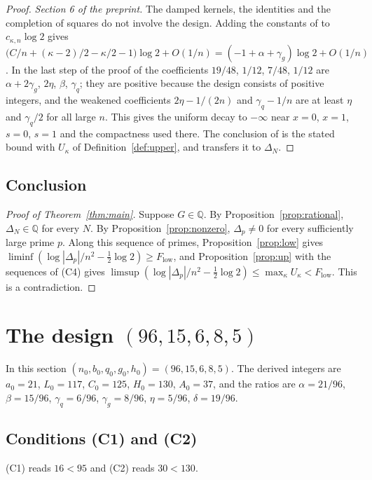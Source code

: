 \documentclass[11pt]{article}
\theoremstyle{definition}
\begin{document}
\begin{proof}
\emph{Section 6 of the preprint.} The damped kernels, the identities \cite[Eqs.~(86), (87)]{OAI} and the completion of squares do not involve the design. Adding the constants of \cite[Eqs.~(86), (87)]{OAI} to $c_{\kappa,n}\log2$ gives $\big(C/n+(\kappa-2)/2-\kappa/2-1\big)\log2+O(1/n)=(-1+\alpha+\gamma_g)\log2+O(1/n)$. In the last step of the proof of \cite[Prop.~6.1]{OAI} the coefficients $19/48$, $1/12$, $7/48$, $1/12$ are $\alpha+2\gamma_g$, $2\eta$, $\beta$, $\gamma_q$; they are positive because the design consists of positive integers, and the weakened coefficients $2\eta-1/(2n)$ and $\gamma_q-1/n$ are at least $\eta$ and $\gamma_q/2$ for all large $n$. This gives the uniform decay to $-\infty$ near $x=0$, $x=1$, $s=0$, $s=1$ and the compactness used there. The conclusion of \cite[Prop.~6.1]{OAI} is the stated bound with $U_\kappa$ of Definition~\ref{def:upper}, and \cite[Eq.~(75)]{OAI} transfers it to $\Delta_N$.
\end{proof}

\subsection{Conclusion}

\begin{proof}[Proof of Theorem~\ref{thm:main}]
Suppose $G\in\mathbb Q$. By Proposition~\ref{prop:rational}, $\Delta_N\in\mathbb Q$ for every $N$. By Proposition~\ref{prop:nonzero}, $\Delta_p\ne0$ for every sufficiently large prime $p$. Along this sequence of primes, Proposition~\ref{prop:low} gives $\liminf(\log|\Delta_p|/n^2-\frac12\log2)\ge F_{\mathrm{low}}$, and Proposition~\ref{prop:up} with the sequences of (C4) gives $\limsup(\log|\Delta_p|/n^2-\frac12\log2)\le\max_\kappa U_\kappa<F_{\mathrm{low}}$. This is a contradiction.
\end{proof}

\section{The design \texorpdfstring{$(96,15,6,8,5)$}{(96,15,6,8,5)}}\label{sec:design}

In this section $(n_0,b_0,q_0,g_0,h_0)=(96,15,6,8,5)$. The derived integers are $a_0=21$, $L_0=117$, $C_0=125$, $H_0=130$, $A_0=37$, and the ratios are $\alpha=21/96$, $\beta=15/96$, $\gamma_q=6/96$, $\gamma_g=8/96$, $\eta=5/96$, $\delta=19/96$.

\subsection{Conditions (C1) and (C2)}
(C1) reads $16<95$ and (C2) reads $30<130$.
\end{document}
